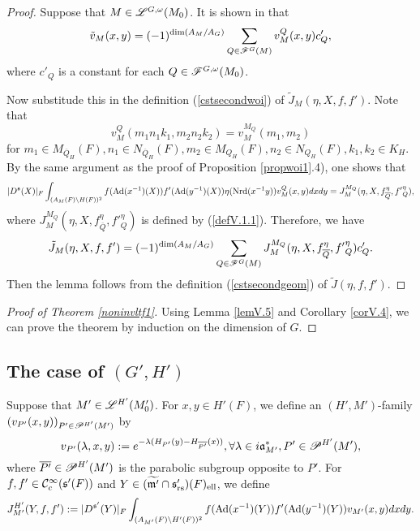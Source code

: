 \documentclass[a4paper]{amsart}
\newcommand{\fa}{{\mathfrak{a}}} \newcommand{\fb}{{\mathfrak{b}}}\newcommand{\fc}{{\mathfrak{c}}} \newcommand{\fd}{{\mathfrak{d}}}
\newcommand{\fm}{{\mathfrak{m}}} \newcommand{\fn}{{\mathfrak{n}}}\newcommand{\fo}{{\mathfrak{o}}} \newcommand{\fp}{{\mathfrak{p}}}
\newcommand{\ov}{\overline}
\newcommand{\wt}{\widetilde}                        \newcommand{\wh}{\widehat}                      \newcommand{\wpair}[1]{\left\{{#1}\right\}}
\theoremstyle{definition}
\theoremstyle{remark}
\numberwithin{equation}{subsection}
\begin{document}
\begin{proof}
Suppose that $M\in\mathscr{L}^{G,\omega}(M_0)$. It is shown in \cite[p. 92]{MR1114210} that 
$$ \tilde{v}_M(x,y)=(-1)^{\dim(A_M/A_G)}\sum_{Q\in\mathscr{F}^G(M)} v_M^Q(x,y) c'_Q, $$
where $c'_Q$ is a constant for each $Q\in\mathscr{F}^{G,\omega}(M_0)$. 

Now substitude this in the definition (\ref{cstsecondwoi}) of $\tilde{J}_M(\eta, X, f, f')$. Note that
$$ v_M^Q(m_1 n_1 k_1, m_2 n_2 k_2)=v_M^{M_Q}(m_1, m_2) $$
for $m_1\in M_{\ov{Q}_H}(F), n_1\in N_{\ov{Q}_H}(F), m_2\in M_{Q_H}(F), n_2\in N_{Q_H}(F), k_1,k_2\in K_H$. By the same argument as the proof of Proposition \ref{propwoi1}.4), one shows that
$$ |D^\fs(X)|_F \int_{(A_M(F)\bs H(F))^2} f(\Ad(x^{-1})(X)) f'(\Ad(y^{-1})(X)) \eta(\Nrd(x^{-1}y)) v_M^Q(x, y) dx dy=J_M^{M_Q}(\eta,X,f_{\ov{Q}}^\eta,{f'}_Q^\eta), $$
where $J_M^{M_Q}(\eta,X,f_{\ov{Q}}^\eta,{f'}_Q^\eta)$ is defined by (\ref{defV.1.1}). Therefore, we have
$$ \tilde{J}_M(\eta, X, f, f')=(-1)^{\dim(A_M/A_G)} \sum_{Q\in\msf^G(M)} J_M^{M_Q}(\eta,X,f_{\ov{Q}}^\eta,{f'}_Q^\eta) c'_Q. $$
Then the lemma follows from the definition (\ref{cstsecondgeom}) of $\tilde{J}(\eta, f, f')$. 
\end{proof}

\begin{proof}[Proof of Theorem \ref{noninvltf1}]
Using Lemma \ref{lemV.5} and Corollary \ref{corV.4}, we can prove the theorem by induction on the dimension of $G$. 
\end{proof}

\subsection{The case of $(G',H')$}

Suppose that $M'\in\mathscr{L}^{H'}(M'_0)$. For $x,y\in H'(F)$, we define an $(H',M')$-family $(v_{P'}(x,y))_{P'\in\mathscr{P}^{H'}(M')}$ by
$$ v_{P'}(\lambda,x,y):=e^{-\lambda(H_{P'}(y)-H_{\ov{P'}}(x))}, \forall \lambda\in i\fa_{M'}^\ast, P'\in\msp^{H'}(M'), $$
where $\ov{P'}\in\msp^{H'}(M')$ is the parabolic subgroup opposite to $P'$. For $f, f'\in{\mathcal {C}}_c^\infty({\mathfrak{s}}'(F))$ and $Y\in(\wt{\fm'}\cap\fs'_\rs)(F)_\el$, we define
\begin{equation}\label{defV.1.2}
 J_{M'}^{H'}(Y, f, f'):=|D^{{\mathfrak{s}}'}(Y)|_F \int_{(A_{M'}(F)\backslash H'(F))^2} f({\mathrm{Ad}}(x^{-1})(Y)) f'({\mathrm{Ad}}(y^{-1})(Y)) v_{M'}(x, y) dx dy. 
\end{equation}
\end{document}
